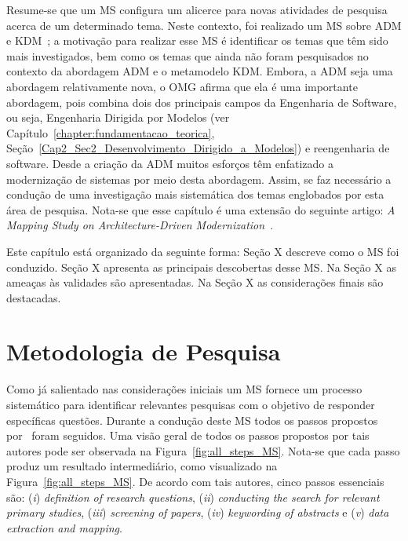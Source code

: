 Resume-se que um MS configura um alicerce para novas atividades de pesquisa acerca de um determinado tema. Neste contexto, foi realizado um MS sobre ADM e KDM~\cite{durelli_systematic_mapping}; a motivação para realizar esse MS é identificar os temas que têm sido mais investigados, bem como os temas que ainda não foram pesquisados no contexto da abordagem ADM e o metamodelo KDM. Embora, a ADM seja uma abordagem relativamente nova, o OMG afirma que ela é uma importante abordagem, pois combina dois dos principais campos da Engenharia de Software, ou seja, Engenharia Dirigida por Modelos (ver Capítulo~\ref{chapter:fundamentacao_teorica}, Seção~\ref{Cap2_Sec2_Desenvolvimento_Dirigido_a_Modelos}) e reengenharia de software. Desde a criação da ADM muitos esforços têm enfatizado a modernização de sistemas por meio desta abordagem. Assim, se faz necessário a condução de uma investigação mais sistemática dos temas englobados por esta área de pesquisa. Nota-se que esse capítulo é uma extensão do seguinte artigo: \textit{A Mapping Study on Architecture-Driven Modernization}~\cite{durelli_systematic_mapping}.


Este capítulo está organizado da seguinte forma: Seção X descreve como o MS foi conduzido. Seção X apresenta as principais descobertas desse MS. Na Seção X as ameaças às validades são apresentadas. Na Seção X as considerações finais são destacadas.

\section{Metodologia de Pesquisa}\label{sec:metodologia_pesquisa}

Como já salientado nas considerações iniciais um MS fornece um processo sistemático para identificar relevantes pesquisas com o objetivo de responder específicas questões. Durante a condução deste MS todos os passos propostos por~ foram seguidos. Uma visão geral de todos os passos propostos por tais autores pode ser observada na Figura~\ref{fig:all_steps_MS}. Nota-se que cada passo produz um resultado intermediário, como visualizado na Figura~\ref{fig:all_steps_MS}. De acordo com tais autores, cinco passos essenciais são: (\textit{i}) \textit{definition of research questions}, (\textit{ii}) \textit{conducting the search for relevant primary studies}, (\textit{iii}) \emph{screening} \textit{of papers}, (\textit{iv}) \emph{keywording} \textit{of abstracts} e (\textit{v}) \textit{data extraction and mapping}. 

